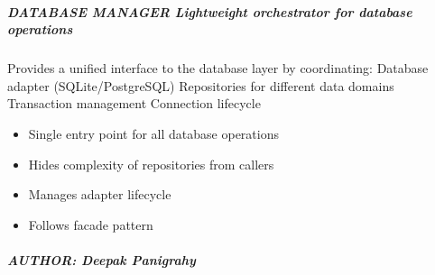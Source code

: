 \documentclass[letterpaper,10pt,english]{sphinxmanual}
\begin{document}
\subparagraph{DATABASE MANAGER \textendash{} Lightweight orchestrator for database operations}
\label{\detokenize{core.database.manager:database-manager-lightweight-orchestrator-for-database-operations}}\begin{description}
\sphinxAtStartPar
Provides a unified interface to the database layer by coordinating:
\sphinxhyphen{} Database adapter (SQLite/PostgreSQL)
\sphinxhyphen{} Repositories for different data domains
\sphinxhyphen{} Transaction management
\sphinxhyphen{} Connection lifecycle

\begin{itemize}
\item {} 
\sphinxAtStartPar
Single entry point for all database operations

\item {} 
\sphinxAtStartPar
Hides complexity of repositories from callers

\item {} 
\sphinxAtStartPar
Manages adapter lifecycle

\item {} 
\sphinxAtStartPar
Follows facade pattern

\end{itemize}

\end{description}


\subparagraph{AUTHOR: Deepak Panigrahy}
\label{\detokenize{core.database.manager:author-deepak-panigrahy}}
\end{document}
